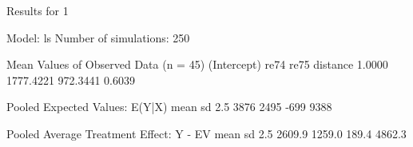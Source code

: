 \begin{enumerate}
\begin{Schunk}
\begin{Soutput}
Results for 1 

  Model: ls 
  Number of simulations: 250 

Mean Values of Observed Data (n = 45) 
(Intercept)        re74        re75    distance 
     1.0000   1777.4221    972.3441      0.6039 

Pooled Expected Values: E(Y|X)
 mean    sd  2.5% 97.5% 
 3876  2495  -699  9388 

Pooled Average Treatment Effect: Y - EV
  mean     sd   2.5%  97.5% 
2609.9 1259.0  189.4 4862.3 


\end{Soutput}
\end{Schunk}
  
\end{enumerate}

